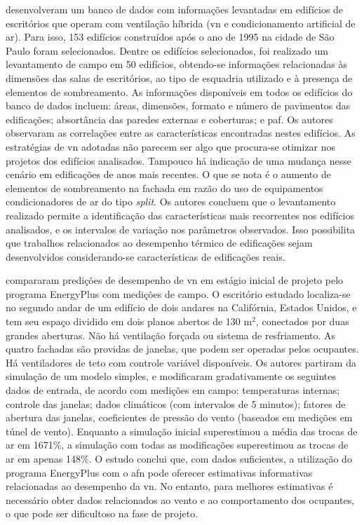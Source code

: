 \documentclass[brazil,hardcopy,openany]{ufscthesis} %
\begin{document}
 desenvolveram um banco de dados com informações levantadas em edifícios de escritórios que operam com ventilação híbrida (\acrshort{vn} e condicionamento artificial de ar). Para isso, 153 edifícios construídos após o ano de 1995 na cidade de São Paulo foram selecionados. Dentre os edifícios selecionados, foi realizado um levantamento de campo em 50 edifícios, obtendo-se informações relacionadas às dimensões das salas de escritórios, ao tipo de esquadria utilizado e à presença de elementos de sombreamento. As informações disponíveis em todos os edifícios do banco de dados incluem: áreas, dimensões, formato e número de pavimentos das edificações; absortância das paredes externas e coberturas; e \acrfull{paf}. Os autores observaram as correlações entre as características encontradas nestes edifícios. As estratégias de \acrshort{vn} adotadas não parecem ser algo que procura-se otimizar nos projetos dos edifícios analisados. Tampouco há indicação de uma mudança nesse cenário em edificações de anos mais recentes. O que se nota é o aumento de elementos de sombreamento na fachada em razão do uso de equipamentos condicionadores de ar do tipo \textit{split}. Os autores concluem que o levantamento realizado permite a identificação das características mais recorrentes nos edifícios analisados, e os intervalos de variação nos parâmetros observados.
Isso possibilita que trabalhos relacionados ao desempenho térmico de edificações sejam desenvolvidos considerando-se características de edificações reais.

 compararam predições de desempenho de \acrshort{vn} em estágio inicial de projeto pelo programa EnergyPlus com medições de campo. O escritório estudado localiza-se no segundo andar de um edifício de dois andares na Califórnia, Estados Unidos, e tem seu espaço dividido em dois planos abertos de 130 m$^2$, conectados por duas grandes aberturas. Não há ventilação forçada ou sistema de resfriamento. As quatro fachadas são providas de janelas, que podem ser operadas pelos ocupantes. Há ventiladores de teto com controle variável disponíveis. Os autores partiram da simulação de um modelo simples, e modificaram gradativamente os seguintes dados de entrada, de acordo com medições em campo: temperaturas internas; controle das janelas; dados climáticos (com intervalos de 5 minutos); fatores de abertura das janelas, coeficientes de pressão do vento (baseados em medições em túnel de vento). Enquanto a simulação inicial superestimou a média das trocas de ar em 1671\%, a simulação com todas as modificações superestimou as trocas de ar em apenas 148\%. O estudo conclui que, com dados suficientes, a utilização do programa EnergyPlus com o \acrshort{afn} pode oferecer  estimativas informativas relacionadas ao desempenho da \acrshort{vn}. No entanto, para melhores estimativas é necessário obter dados relacionados ao vento e ao comportamento dos ocupantes, o que pode ser dificultoso na fase de projeto.
\end{document}
